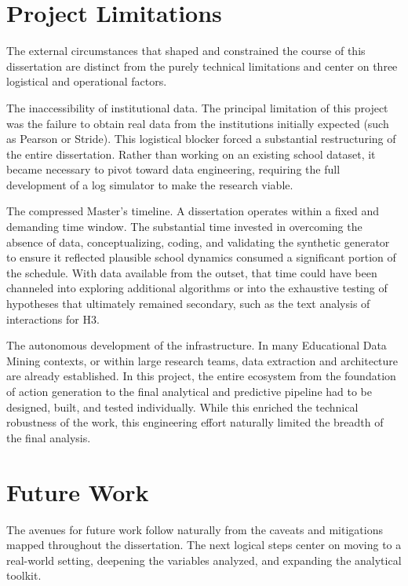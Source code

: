 \section{Project Limitations}
\label{sec:project-limitations}

The external circumstances that shaped and constrained the course of this dissertation are distinct from the purely technical limitations and center on three logistical and operational factors.

The inaccessibility of institutional data. The principal limitation of this project was the failure to obtain real data from the institutions initially expected (such as Pearson or Stride). This logistical blocker forced a substantial restructuring of the entire dissertation. Rather than working on an existing school dataset, it became necessary to pivot toward data engineering, requiring the full development of a log simulator to make the research viable.

The compressed Master's timeline. A dissertation operates within a fixed and demanding time window. The substantial time invested in overcoming the absence of data, conceptualizing, coding, and validating the synthetic generator to ensure it reflected plausible school dynamics consumed a significant portion of the schedule. With data available from the outset, that time could have been channeled into exploring additional algorithms or into the exhaustive testing of hypotheses that ultimately remained secondary, such as the text analysis of interactions for H3.

The autonomous development of the infrastructure. In many Educational Data Mining contexts, or within large research teams, data extraction and architecture are already established. In this project, the entire ecosystem from the foundation of action generation to the final analytical and predictive pipeline had to be designed, built, and tested individually. While this enriched the technical robustness of the work, this engineering effort naturally limited the breadth of the final analysis.

\section{Future Work}
\label{sec:future-work}

The avenues for future work follow naturally from the caveats and mitigations mapped throughout the dissertation. The next logical steps center on moving to a real-world setting, deepening the variables analyzed, and expanding the analytical toolkit.

